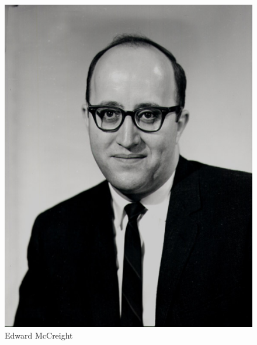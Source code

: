 \begin{frame}
\begin{columns}
\begin{column}{0.3\textwidth}
\begin{block}{}
\begin{figure}
                    \includegraphics[height=0.35\textheight]{resources/made/McCreight.png}
                    \caption[]{Edward McCreight}
                \end{figure}
            \end{block}
        \end{column}
    \end{columns}
\end{frame}
